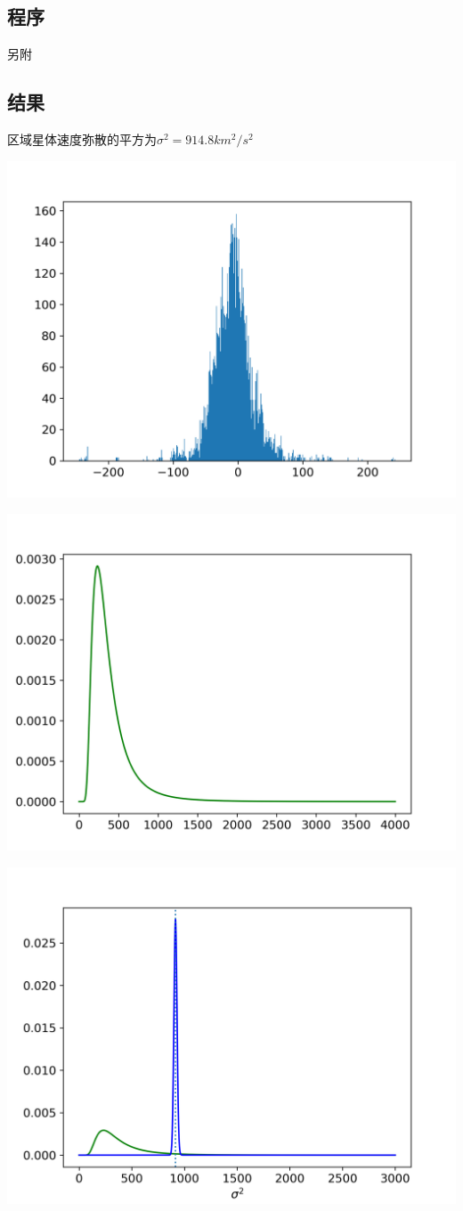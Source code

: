 \documentclass[12pt, letterpaper]{article}
\begin{document}
\subsection{程序}
另附
\subsection{结果}
区域星体速度弥散的平方为$\sigma^2=914.8km^2/s^2$

\includegraphics[scale=0.7]{3_1.png}

\includegraphics[scale=0.7]{3_2.png}

\includegraphics[scale=0.7]{3_3.png}
\end{document}
